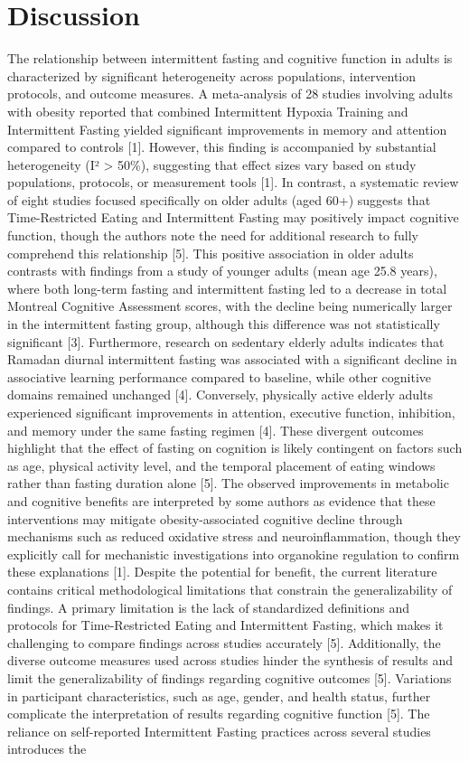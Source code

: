 \documentclass[conference]{IEEEtran}
\begin{document}
\section{Discussion}
The relationship between intermittent fasting and cognitive function in adults is characterized by significant heterogeneity across populations, intervention protocols, and outcome measures. A meta-analysis of 28 studies involving adults with obesity reported that combined Intermittent Hypoxia Training and Intermittent Fasting yielded significant improvements in memory and attention compared to controls [1]. However, this finding is accompanied by substantial heterogeneity (I² > 50\%), suggesting that effect sizes vary based on study populations, protocols, or measurement tools [1]. In contrast, a systematic review of eight studies focused specifically on older adults (aged 60+) suggests that Time-Restricted Eating and Intermittent Fasting may positively impact cognitive function, though the authors note the need for additional research to fully comprehend this relationship [5]. This positive association in older adults contrasts with findings from a study of younger adults (mean age 25.8 years), where both long-term fasting and intermittent fasting led to a decrease in total Montreal Cognitive Assessment scores, with the decline being numerically larger in the intermittent fasting group, although this difference was not statistically significant [3]. Furthermore, research on sedentary elderly adults indicates that Ramadan diurnal intermittent fasting was associated with a significant decline in associative learning performance compared to baseline, while other cognitive domains remained unchanged [4]. Conversely, physically active elderly adults experienced significant improvements in attention, executive function, inhibition, and memory under the same fasting regimen [4]. These divergent outcomes highlight that the effect of fasting on cognition is likely contingent on factors such as age, physical activity level, and the temporal placement of eating windows rather than fasting duration alone [5]. The observed improvements in metabolic and cognitive benefits are interpreted by some authors as evidence that these interventions may mitigate obesity-associated cognitive decline through mechanisms such as reduced oxidative stress and neuroinflammation, though they explicitly call for mechanistic investigations into organokine regulation to confirm these explanations [1]. Despite the potential for benefit, the current literature contains critical methodological limitations that constrain the generalizability of findings. A primary limitation is the lack of standardized definitions and protocols for Time-Restricted Eating and Intermittent Fasting, which makes it challenging to compare findings across studies accurately [5]. Additionally, the diverse outcome measures used across studies hinder the synthesis of results and limit the generalizability of findings regarding cognitive outcomes [5]. Variations in participant characteristics, such as age, gender, and health status, further complicate the interpretation of results regarding cognitive function [5]. The reliance on self-reported Intermittent Fasting practices across several studies introduces the 
\end{document}
